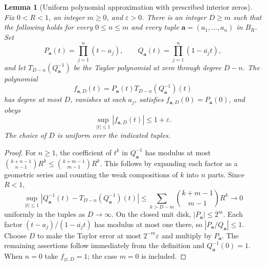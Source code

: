 \documentclass[11pt,a4paper]{article}
\numberwithin{equation}{section}
\newtheorem{lemma}[theorem]{Lemma}
\theoremstyle{definition}
\theoremstyle{remark}
\begin{document}
\begin{lemma}[Uniform polynomial approximation with prescribed interior zeros]
\label{lem:finite-blaschke-polynomial-approximation}
Fix $0<R<1$, an integer $m\ge0$, and $\varepsilon>0$. There is
an integer $D\ge m$ such that the following holds for every
$0\le n\le m$ and every tuple $\mathbf a=(a_1,\ldots,a_n)$ in
$B_R$. Set
\[
 P_{\mathbf a}(t)=\prod_{j=1}^n(t-a_j),\qquad
 Q_{\mathbf a}(t)=\prod_{j=1}^n(1-\overline{a_j}t),
\]
and let $T_{D-n}(Q_{\mathbf a}^{-1})$ be the Taylor polynomial at
zero through degree $D-n$. The polynomial
\[
 f_{\mathbf a,D}(t)=P_{\mathbf a}(t)
                         T_{D-n}(Q_{\mathbf a}^{-1})(t)
\]
has degree at most $D$, vanishes at each $a_j$, satisfies
$f_{\mathbf a,D}(0)=P_{\mathbf a}(0)$, and obeys
\[
 \sup_{|t|\le1}|f_{\mathbf a,D}(t)|\le1+\varepsilon.
\]
The choice of $D$ is uniform over the indicated tuples.
\end{lemma}
\begin{proof}
For $n\ge1$, the coefficient of $t^k$ in $Q_{\mathbf a}^{-1}$
has modulus at most
$\binom{k+n-1}{n-1}R^k\le\binom{k+m-1}{m-1}R^k$.
This follows by expanding each factor as a geometric series and
counting the weak compositions of $k$ into $n$ parts. Since $R<1$,
\[
 \sup_{|t|\le1}\left|
 Q_{\mathbf a}^{-1}(t)-T_{D-n}(Q_{\mathbf a}^{-1})(t)\right|
 \le\sum_{k>D-m}\binom{k+m-1}{m-1}R^k\longrightarrow0
\]
uniformly in the tuples as $D\to\infty$. On the closed unit disk,
$|P_{\mathbf a}|\le2^m$. Each factor
$(t-a_j)/(1-\overline{a_j}t)$ has modulus at most one there,
so $|P_{\mathbf a}/Q_{\mathbf a}|\le1$. Choose $D$ to make
the Taylor error at most $2^{-m}\varepsilon$ and multiply by
$P_{\mathbf a}$. The remaining assertions follow immediately from
the definition and $Q_{\mathbf a}^{-1}(0)=1$. When $n=0$ take
$f_{\varnothing,D}=1$; the case $m=0$ is included.
\end{proof}
\end{document}
